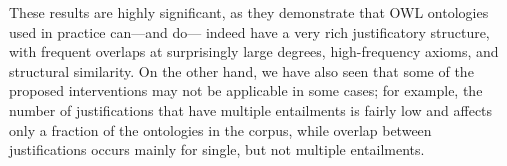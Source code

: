 These results are highly significant, as they demonstrate that OWL ontologies used in practice can---and do--- indeed have a very rich justificatory structure, with frequent overlaps at surprisingly large degrees, high-frequency axioms, and structural similarity. On the other hand, we have also seen that some of the proposed interventions may not be applicable in some cases; for example, the number of justifications that have multiple entailments is fairly low and affects only a fraction of the ontologies in the corpus, while overlap between justifications occurs mainly for single, but not multiple entailments.
